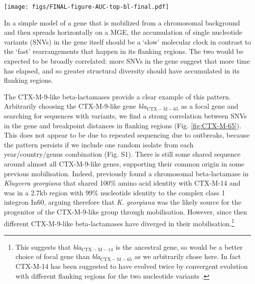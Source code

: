 \documentclass[rmp,superscriptaddress,11pt]{revtex4-1}
\newcommand{\bla}[1]{\textit{bla}$_\mathrm{#1}$}
\begin{document}
\begin{figure*}
    \centering
    \texttt{[image: figs/FINAL-figure-AUC-top-bl-final.pdf]}
    \caption{\textbf{Structural diversity correlates with nucleotide-level variation.} Across different beta-lactamases the presence of any SNV in the focal gene is generally correlated with a shorter flanking region overlap (sum of average upstream and downstream pairwise breakpoint distances). (a) shows linear fits (\texttt{stat\_smooth}) and (b) average per SNV-level comparison for $n=7$ genes with >100 genomes in the initial dataset (Table \ref{table:bl-genes}). Pairwise comparisons have been deduplicated for year/country/genus combinations before plotting. The flanking region overlap is the sum of the upstream and downstream average breakpoint distances. Number of data points for each gene (after deduplicating): \bla{CMY-2} (n=108), \bla{CTX-M-15} (n=274), \bla{CTX-M-65} (n=119), \bla{GES-1} (n=15), \bla{KPC-2} (n=161), \bla{NDM-1} (n=175), \bla{OXA-48} (n=66), \bla{TEM-1} (n=514).}
    \label{fig:AUC-decay}
\end{figure*}

\noindent In a simple model of a gene that is mobilized from a chromosomal background and then spreads horizontally on a MGE, the accumulation of single nucleotide variants (SNVs) in the gene itself should be a `slow' molecular clock in contrast to the `fast' rearrangements that happen in its flanking regions. The two would be expected to be broadly correlated: more SNVs in the gene suggest that more time has elapsed, and so greater structural diversity should have accumulated in its flanking regions.\par

The CTX-M-9-like beta-lactamases provide a clear example of this pattern. Arbitrarily choosing the CTX-M-9-like gene \bla{CTX-M-65} as a focal gene and searching for sequences with variants, we find a strong correlation between SNVs in the gene and breakpoint distances in flanking regions (Fig. \ref{fig:CTX-M-65}). This does not appear to be due to repeated sequencing due to outbreaks, because the pattern persists if we include one random isolate from each year/country/genus combination (Fig. S1). There is still some shared sequence around almost all CTX-M-9-like genes, supporting their common origin in some previous mobilisation. Indeed, previously \textcite{Olson2005} found a chromosomal beta-lactamase in \textit{Kluyvera georgiana} that shared 100\% amino acid identity with CTX-M-14 and was in a 2.7kb region with 99\% nucleotide identity to the complex class 1 integron In60, arguing therefore that \textit{K. georgiana} was the likely source for the progenitor of the CTX-M-9-like group through mobilisation. However, since then different CTX-M-9-like beta-lactamases have diverged in their mobilisation.\footnote{This suggests that \bla{CTX-M-14} is the ancestral gene, so would be a better choice of focal gene than \bla{CTX-M-65} as we arbitrarily chose here. In fact CTX-M-14 has been suggested to have evolved twice by convergent evolution with different flanking regions for the two nucleotide variants \cite{Navarro2007}.}\par
\end{document}
